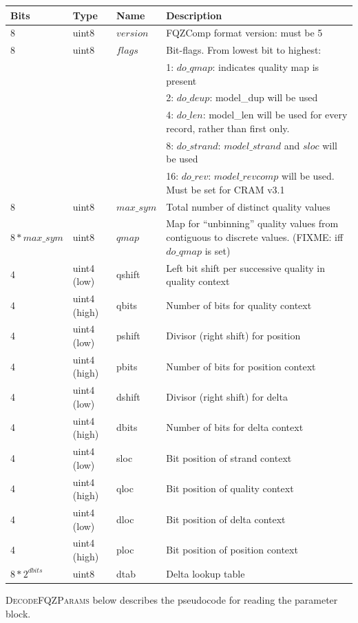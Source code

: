 \documentclass[a4paper]{article}
\begin{document}
\begin{tabular}{lllp{12cm}}
\hline
\textbf{Bits} & \textbf{Type} & \textbf{Name} & \textbf{Description}\\
\hline
8 & uint8 & $version$ & FQZComp format version: must be 5\\
8 & uint8 & $flags$ & Bit-flags. From lowest bit to highest:\\
& & & 1: $do\_qmap$: indicates quality map is present\\
& & & 2: $do\_deup$: model\_dup will be used\\
& & & 4: $do\_len$: model\_len will be used for every record, rather than first only.\\
& & & 8: $do\_strand$: $model\_strand$ and $sloc$ will be used\\
& & & 16: $do\_rev$: $model\_revcomp$ will be used. Must be set for CRAM v3.1\\
8 & uint8 & $max\_sym$ & Total number of distinct quality values\\
\hline
$8*max\_sym$ & uint8 & $qmap$ & Map for ``unbinning'' quality values from contiguous to discrete values. (FIXME: iff $do\_qmap$ is set)\\
\hline
4 & uint4 (low)  & qshift & Left bit shift per successive quality in quality context\\
4 & uint4 (high) & qbits  & Number of bits for quality context\\
4 & uint4 (low)  & pshift & Divisor (right shift) for position\\
4 & uint4 (high) & pbits  & Number of bits for position context\\
4 & uint4 (low)  & dshift & Divisor (right shift) for delta\\
4 & uint4 (high) & dbits  & Number of bits for delta context\\
4 & uint4 (low)  & sloc   & Bit position of strand context\\
4 & uint4 (high) & qloc   & Bit position of quality context\\
4 & uint4 (low)  & dloc   & Bit position of delta context\\
4 & uint4 (high) & ploc   & Bit position of position context\\
\hline
$8*2^{dbits}$ & uint8 & dtab & Delta lookup table\\
\hline
\end{tabular}

\textsc{DecodeFQZParams} below describes the pseudocode for reading
the parameter block.
\end{document}
